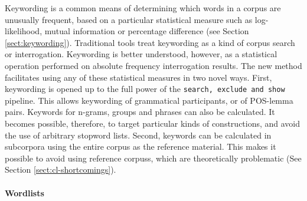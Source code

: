 Keywording is a common means of determining which words in a \gls{corpus} are unusually frequent, based on a particular statistical measure such as log\hyp{}likelihood, mutual information or percentage difference (see Section \ref{sect:keywording}). Traditional tools treat keywording as a kind of \gls{corpus} search or interrogation. Keywording is better understood, however, as a statistical operation performed on absolute frequency interrogation results. The new method facilitates using any of these statistical measures in two novel ways. First, keywording is opened up to the full power of the \texttt{search, exclude and show} pipeline. This allows keywording of grammatical participants, or of \gls{POS}\hyp{}lemma pairs. Keywords for n\hyp{}grams, groups and phrases can also be calculated. It becomes possible, therefore, to target particular kinds of constructions, and avoid the use of arbitrary stopword lists. Second, keywords can be calculated in subcorpora using the entire \gls{corpus} as the reference material. This makes it possible to avoid using reference \glspl{corpus}, which are theoretically problematic (See Section \ref{sect:cl-shortcomings}).

\paragraph{Wordlists}

